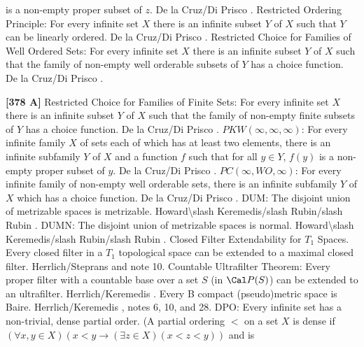 is a non-empty proper subset of $z$.  De la Cruz/Di \ac{Prisco}
\cite{1998a}.
\medskip
{} Restricted Ordering Principle:  For every
infinite set $X$ there is an infinite subset $Y$ of $X$ such that $Y$
can be linearly ordered.  De la Cruz/Di \ac{Prisco} \cite{1998a}.
\medskip
{} Restricted Choice for Families of Well Ordered
Sets:  For every infinite set $X$ there is an infinite subset $Y$ of
$X$ such that the family of non-empty well orderable subsets of $Y$
has a choice function.  De la Cruz/Di \ac{Prisco} \cite{1998a}.
\smallskip
\item{}{\bf [378 A]} Restricted Choice for Families of Finite Sets:
For every infinite set $X$ there is an infinite subset $Y$ of
$X$ such that the family of non-empty finite subsets of $Y$
has a choice function.  De la Cruz/Di \ac{Prisco} \cite{1998a}.
\medskip
{} $PKW(\infty,\infty,\infty)$: For every infinite
family $X$ of sets each of which has at least two elements, there
is an infinite subfamily $Y$ of $X$ and a function $f$ such that
for all $y\in Y$, $f(y)$ is a non-empty proper subset of $y$.
De la Cruz/Di \ac{Prisco} \cite{1998a}.
\medskip
{} $PC(\infty,WO,\infty)$:  For every infinite
family of non-empty well orderable sets, there is an infinite subfamily $Y$
of $X$ which has a choice function.  De la Cruz/Di \ac{Prisco} \cite{1998a}.
\medskip
{} DUM:  The disjoint union of metrizable spaces
is metrizable. \ac{Howard\slash Keremedis/slash Rubin/slash Rubin}
\cite{1998b}.
\medskip
{} DUMN:  The disjoint union of metrizable spaces
is normal. \ac{Howard\slash Keremedis/slash Rubin/slash Rubin} \cite{1998b}.
\medskip
\medskip
{} Closed Filter Extendability for $T_1$ Spaces.
Every closed filter in a $T_1$ topological space can be extended to a
maximal closed filter. \ac{Herrlich/Steprans} \cite{1997} and note 10.
\medskip
{} Countable Ultrafilter Theorem:  Every proper
filter with a countable base over a set $S$ (in ${\Cal P}(S)$) can
be extended to an ultrafilter. \ac{Herrlich/Keremedis} \cite{1999a}.
\medskip
{} Every B compact (pseudo)metric space is Baire.
\ac{Herrlich/Keremedis} \cite{1999a}, notes 6, 10, and 28.
\medskip
{} DPO:  Every infinite set has a non-trivial,
dense partial order.  (A partial ordering $<$ on a set $X$ is dense
if $(\forall x, y\in X)(x<y \to (\exists z\in X)(x<z<y))$ and is
